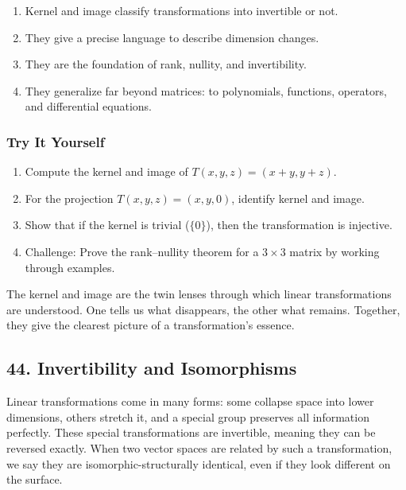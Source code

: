 \documentclass[
  letterpaper,
  DIV=11,
  numbers=noendperiod]{scrreprt}
\providecommand{\tightlist}{%
  \setlength{\itemsep}{0pt}\setlength{\parskip}{0pt}}
\begin{document}
\begin{enumerate}
\def\labelenumi{\arabic{enumi}.}
\tightlist
\item
  Kernel and image classify transformations into invertible or not.
\item
  They give a precise language to describe dimension changes.
\item
  They are the foundation of rank, nullity, and invertibility.
\item
  They generalize far beyond matrices: to polynomials, functions,
  operators, and differential equations.
\end{enumerate}

\subsubsection{Try It Yourself}\label{try-it-yourself-42}

\begin{enumerate}
\def\labelenumi{\arabic{enumi}.}
\tightlist
\item
  Compute the kernel and image of \(T(x,y,z) = (x+y, y+z)\).
\item
  For the projection \(T(x,y,z) = (x,y,0)\), identify kernel and image.
\item
  Show that if the kernel is trivial (\(\{0\}\)), then the
  transformation is injective.
\item
  Challenge: Prove the rank--nullity theorem for a \(3\times 3\) matrix
  by working through examples.
\end{enumerate}

The kernel and image are the twin lenses through which linear
transformations are understood. One tells us what disappears, the other
what remains. Together, they give the clearest picture of a
transformation's essence.

\subsection{44. Invertibility and
Isomorphisms}\label{invertibility-and-isomorphisms}

Linear transformations come in many forms: some collapse space into
lower dimensions, others stretch it, and a special group preserves all
information perfectly. These special transformations are invertible,
meaning they can be reversed exactly. When two vector spaces are related
by such a transformation, we say they are isomorphic-structurally
identical, even if they look different on the surface.
\end{document}
